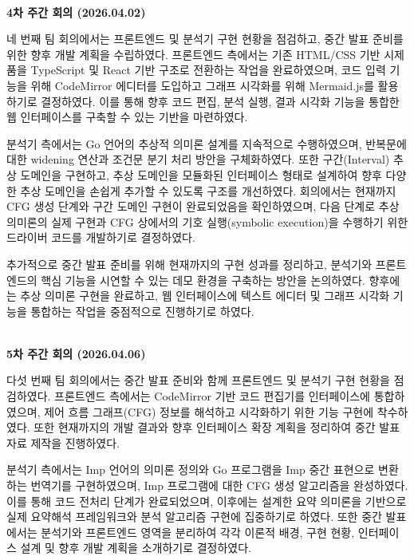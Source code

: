 \documentclass[a4paper,12pt]{article}
\begin{document}
~\\

\textbf{\large 4차 주간 회의 (2026.04.02)}

네 번째 팀 회의에서는 프론트엔드 및 분석기 구현 현황을 점검하고, 중간 발표 준비를 위한 향후 개발 계획을 수립하였다. 프론트엔드 측에서는 기존 HTML/CSS 기반 시제품을 TypeScript 및 React 기반 구조로 전환하는 작업을 완료하였으며, 코드 입력 기능을 위해 CodeMirror 에디터를 도입하고 그래프 시각화를 위해 Mermaid.js를 활용하기로 결정하였다. 이를 통해 향후 코드 편집, 분석 실행, 결과 시각화 기능을 통합한 웹 인터페이스를 구축할 수 있는 기반을 마련하였다.

분석기 측에서는 Go 언어의 추상적 의미론 설계를 지속적으로 수행하였으며, 반복문에 대한 widening 연산과 조건문 분기 처리 방안을 구체화하였다. 또한 구간(Interval) 추상 도메인을 구현하고, 추상 도메인을 모듈화된 인터페이스 형태로 설계하여 향후 다양한 추상 도메인을 손쉽게 추가할 수 있도록 구조를 개선하였다. 회의에서는 현재까지 CFG 생성 단계와 구간 도메인 구현이 완료되었음을 확인하였으며, 다음 단계로 추상 의미론의 실제 구현과 CFG 상에서의 기호 실행(symbolic execution)을 수행하기 위한 드라이버 코드를 개발하기로 결정하였다.

추가적으로 중간 발표 준비를 위해 현재까지의 구현 성과를 정리하고, 분석기와 프론트엔드의 핵심 기능을 시연할 수 있는 데모 환경을 구축하는 방안을 논의하였다. 향후에는 추상 의미론 구현을 완료하고, 웹 인터페이스에 텍스트 에디터 및 그래프 시각화 기능을 통합하는 작업을 중점적으로 진행하기로 하였다.

~\\

\textbf{\large 5차 주간 회의 (2026.04.06)}

다섯 번째 팀 회의에서는 중간 발표 준비와 함께 프론트엔드 및 분석기 구현 현황을 점검하였다. 프론트엔드 측에서는 CodeMirror 기반 코드 편집기를 인터페이스에 통합하였으며, 제어 흐름 그래프(CFG) 정보를 해석하고 시각화하기 위한 기능 구현에 착수하였다. 또한 현재까지의 개발 결과와 향후 인터페이스 확장 계획을 정리하여 중간 발표 자료 제작을 진행하였다.

분석기 측에서는 Imp 언어의 의미론 정의와 Go 프로그램을 Imp 중간 표현으로 변환하는 번역기를 구현하였으며, Imp 프로그램에 대한 CFG 생성 알고리즘을 완성하였다. 이를 통해 코드 전처리 단계가 완료되었으며, 이후에는 설계한 요약 의미론을 기반으로 실제 요약해석 프레임워크와 분석 알고리즘 구현에 집중하기로 하였다. 또한 중간 발표에서는 분석기와 프론트엔드 영역을 분리하여 각각 이론적 배경, 구현 현황, 인터페이스 설계 및 향후 개발 계획을 소개하기로 결정하였다.
\end{document}
